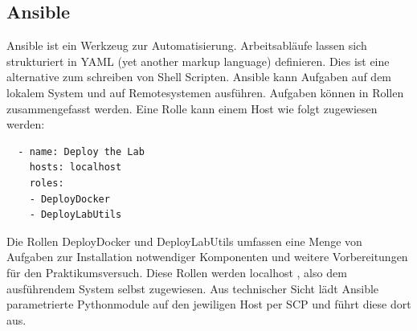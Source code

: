 \subsection{Ansible}

Ansible ist ein Werkzeug zur Automatisierung. Arbeitsabläufe lassen sich strukturiert in YAML (yet another markup language) definieren. Dies ist eine alternative zum schreiben
von Shell Scripten. Ansible kann Aufgaben auf dem lokalem System und auf Remotesystemen ausführen. Aufgaben können in Rollen zusammengefasst werden.  
Eine Rolle kann einem Host wie folgt zugewiesen werden:
\begin{lstlisting}
  - name: Deploy the Lab
    hosts: localhost
    roles:
    - DeployDocker
    - DeployLabUtils
\end{lstlisting}

Die Rollen \grqq DeployDocker \grqq{} und \grqq DeployLabUtils \grqq{} umfassen eine Menge von Aufgaben zur Installation notwendiger Komponenten und weitere Vorbereitungen
für den Praktikumsversuch. Diese Rollen werden \grqq localhost \grqq{}, also dem ausführendem System selbst zugewiesen.
Aus technischer Sicht lädt Ansible parametrierte Pythonmodule auf den jewiligen Host per SCP und führt diese dort aus.


